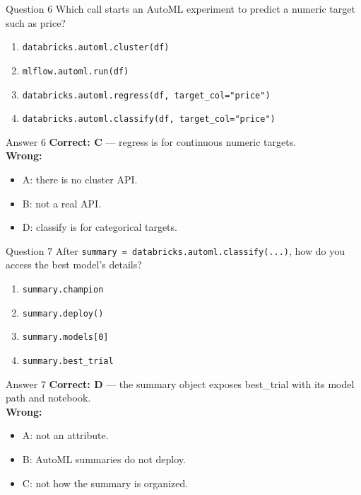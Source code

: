 \documentclass[aspectratio=169,11pt]{beamer}
\begin{document}
	\begin{frame}{Question 6}
		Which call starts an AutoML experiment to predict a numeric target such as price?
		\begin{enumerate}[label=\Alph*.]
			\item \texttt{databricks.automl.cluster(df)}
			\item \texttt{mlflow.automl.run(df)}
			\item \texttt{databricks.automl.regress(df, target\_col="price")}
			\item \texttt{databricks.automl.classify(df, target\_col="price")}
		\end{enumerate}
	\end{frame}
	\begin{frame}{Answer 6}
		\textbf{Correct: C} --- regress is for continuous numeric targets.\\
		\vspace{0.5em}
		\textbf{Wrong:}
		\begin{itemize}
			\item A: there is no cluster API.
			\item B: not a real API.
			\item D: classify is for categorical targets.
		\end{itemize}
	\end{frame}
	
	\begin{frame}{Question 7}
		After \texttt{summary = databricks.automl.classify(...)}, how do you access the best model's details?
		\begin{enumerate}[label=\Alph*.]
			\item \texttt{summary.champion}
			\item \texttt{summary.deploy()}
			\item \texttt{summary.models[0]}
			\item \texttt{summary.best\_trial}
		\end{enumerate}
	\end{frame}
	\begin{frame}{Answer 7}
		\textbf{Correct: D} --- the summary object exposes best\_trial with its model path and notebook.\\
		\vspace{0.5em}
		\textbf{Wrong:}
		\begin{itemize}
			\item A: not an attribute.
			\item B: AutoML summaries do not deploy.
			\item C: not how the summary is organized.
		\end{itemize}
	\end{frame}
	
\end{document}
